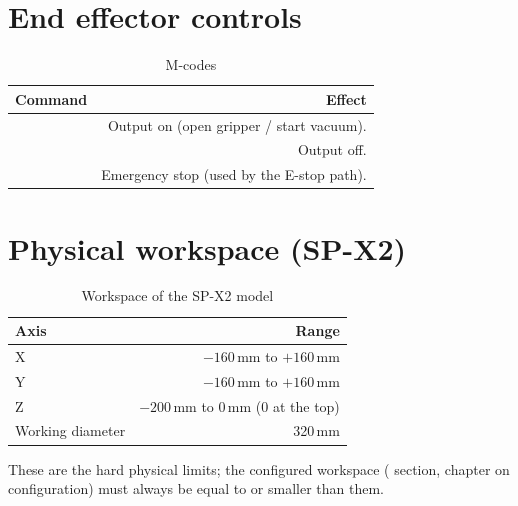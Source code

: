 \section{End effector controls}
%
\begin{table}[h]
  \centering
  \begin{tabularx}{\textwidth}{lD}
    \toprule
    \textbf{Command} & \textbf{Effect} \\
    \midrule
     & Output on (open gripper / start vacuum). \\
     & Output off. \\
     & Emergency stop (used by the E-stop path). \\
    \bottomrule
  \end{tabularx}
  \caption{M-codes}
\end{table}

\section{Physical workspace (SP-X2)}
%
\begin{table}[h]
  \centering
  \begin{tabularx}{\textwidth}{lD}
    \toprule
    \textbf{Axis} & \textbf{Range} \\
    \midrule
    X & $-160$\,mm to $+160$\,mm \\
    Y & $-160$\,mm to $+160$\,mm \\
    Z & $-200$\,mm to $0$\,mm ($0$ at the top) \\
    Working diameter & 320\,mm \\
    \bottomrule
  \end{tabularx}
  \caption{Workspace of the SP-X2 model}
\end{table}

These are the hard physical limits; the configured workspace
(\cfg{[robot]} section, chapter on configuration) must always be equal to
or smaller than them.

